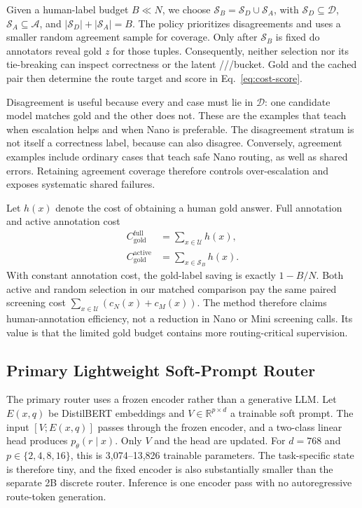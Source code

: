 Given a human-label budget $B\ll N$, we choose
$\mathcal S_B=\mathcal S_D\cup\mathcal S_A$, with
$\mathcal S_D\subseteq\mathcal D$, $\mathcal S_A\subseteq\mathcal A$, and
$|\mathcal S_D|+|\mathcal S_A|=B$. The policy prioritizes disagreements and
uses a smaller random agreement sample for coverage. Only after
$\mathcal S_B$ is fixed do annotators reveal gold $z$ for those tuples.
Consequently, neither selection nor its tie-breaking can inspect correctness or
the latent \bc/\mo/\no/\bw bucket. Gold and the cached pair then determine the
route target and score in Eq.~\ref{eq:cost-score}.

Disagreement is useful because every \mo and \no case must lie in
$\mathcal D$: one candidate model matches gold and the other does not. These
are the examples that teach when escalation helps and when Nano is preferable.
The disagreement stratum is not itself a correctness label, because \bw can
also disagree. Conversely, agreement examples include ordinary \bc cases that
teach safe Nano routing, as well as shared \bw errors. Retaining agreement
coverage therefore controls over-escalation and exposes systematic shared
failures.

Let $h(x)$ denote the cost of obtaining a human gold answer. Full annotation
and active annotation cost
\begin{align}
 C_{\mathrm{gold}}^{\mathrm{full}} &= \sum_{x\in\mathcal U}h(x),\\
 C_{\mathrm{gold}}^{\mathrm{active}} &= \sum_{x\in\mathcal S_B}h(x).
 \label{eq:annotation-cost}
\end{align}
With constant annotation cost, the gold-label saving is exactly $1-B/N$.
Both active and random selection in our matched comparison pay the same paired
screening cost $\sum_{x\in\mathcal U}(c_N(x)+c_M(x))$. The method therefore
claims human-annotation efficiency, not a reduction in Nano or Mini screening
calls. Its value is that the limited gold budget contains more routing-critical
supervision.

\subsection{Primary Lightweight Soft-Prompt Router}

The primary router uses a frozen encoder rather than a generative LLM. Let
$E(x,q)$ be DistilBERT embeddings and
$V\in\mathbb{R}^{p\times d}$ a trainable soft prompt. The input
$[V;E(x,q)]$ passes through the frozen encoder, and a two-class linear head
produces $p_\theta(r\mid x)$. Only $V$ and the head are updated. For
$d=768$ and $p\in\{2,4,8,16\}$, this is 3,074--13,826 trainable parameters.
The task-specific state is therefore tiny, and the fixed encoder is also
substantially smaller than the separate 2B discrete router. Inference is one
encoder pass with no autoregressive route-token generation.

